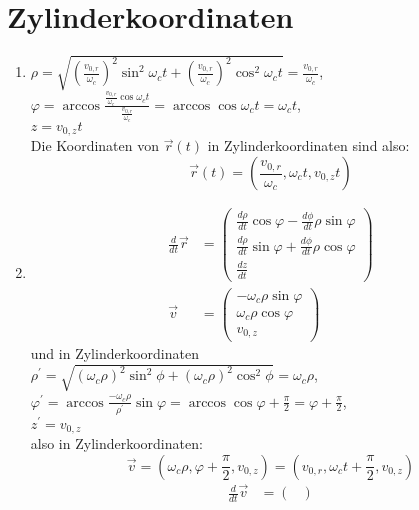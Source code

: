 \documentclass[sectionformat = aufgabe]{gadsescript}
\begin{document}
\section{Zylinderkoordinaten}
\begin{enumerate}[label=\alph*)]
	\item $ \rho = \sqrt{ \left(\frac{v_{0,r}}{\omega_c}\right)^2 \sin^2 \omega_c t + \left(\frac{v_{0,r}}{\omega_c}\right)^2 \cos^2 \omega_c t} = \frac{v_{0,r}}{\omega_c} $,\\
		$ \varphi = \arccos \frac{\frac{v_{0,r}}{\omega_c} \cos \omega_c t}{\frac{v_{0,r}}{\omega_c}} = \arccos \cos \omega_c t = \omega_c t $, \\
		$ z = v_{0,z} t $\\
		Die Koordinaten von $ \vec r (t) $ in Zylinderkoordinaten sind also:
		\[ \vec r (t) = \left( \frac{v_{0,r}}{\omega_c}, \omega_c t, v_{0,z} t \right)\]
	\item
		\begin{align*}
			\frac{d}{dt} \vec r &=
			\begin{pmatrix}
				\frac{d\rho}{dt} \cos \varphi - \frac{d\phi}{dt} \rho \sin \varphi\\
				\frac{d\rho}{dt} \sin \varphi + \frac{d\phi}{dt} \rho \cos \varphi\\
				\frac{dz}{dt}
			\end{pmatrix}\\
			\vec v &= 
			\begin{pmatrix}
				- \omega_c \rho \sin \varphi\\
				\omega_c \rho \cos \varphi\\
				v_{0,z}
			\end{pmatrix}
		\end{align*}
		und in Zylinderkoordinaten\\
		$ \rho^\prime = \sqrt{ \left(\omega_c \rho \right)^2 \sin^2 \phi + \left(\omega_c \rho\right)^2 \cos^2 \phi} = \omega_c \rho $,\\
		$ \varphi^\prime = \arccos \frac{-\omega_c \rho}{\rho^\prime} \sin \varphi = \arccos \cos \varphi + \frac{\pi}{2} = \varphi + \frac{\pi}{2} $, \\
		$ z^\prime = v_{0,z} $\\
		also in Zylinderkoordinaten:
		\[ \vec v = \left( \omega_c \rho, \varphi + \frac{\pi}{2}, v_{0,z} \right) = \left( v_{0, r}, \omega_c t + \frac{\pi}{2}, v_{0, z} \right)\]
		\begin{align*}
			\frac{d}{dt} \vec v &=
			\begin{pmatrix}

\end{pmatrix}
\end{align*}
\end{enumerate}
\end{document}
